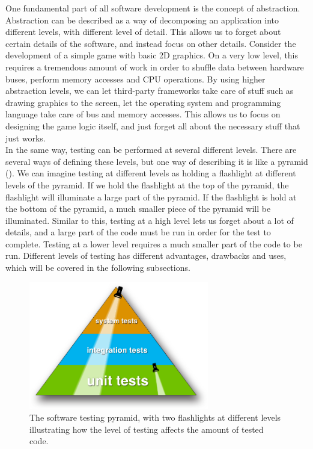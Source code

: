 
One fundamental part of all software development is the concept of
abstraction. Abstraction can be described as a way of decomposing  an
application into different levels, with different level of detail. This
allows us to forget about certain details of the software, and  instead
focus on other details. Consider the development of a simple game with
basic 2D graphics. On a very low level, this requires a tremendous
amount of work in order to shuffle data between hardware buses, perform
memory accesses and CPU operations. By using higher abstraction levels,
we can let third-party frameworks take care of stuff such as drawing
graphics to the screen, let the operating system and programming
language take care of bus and memory accesses. This allows us to focus
on designing the game logic itself, and just forget all about the
necessary stuff that just works.\cite{paper:abstraction}\\

In the same way, testing can be performed at several different levels.
There are several ways of defining these levels, but one way of
describing it is like a pyramid (). We can
imagine testing at different levels as holding a flashlight at different
levels of the pyramid. If we hold the flashlight at the top of the
pyramid, the flashlight will illuminate a large part of the pyramid. If
the flashlight is hold at the bottom of the pyramid, a much smaller
piece of the pyramid will be illuminated. Similar to this, testing at a
high level lets us forget about a lot of details, and a large part of
the code must be run in order for the test to complete. Testing at a
lower level requires a much smaller part of the code to be run.
Different levels of testing has different advantages, drawbacks and
uses, which will be covered in the following subsections.\\

\begin{figure}
\centering
\includegraphics[width=0.7\textwidth]{theory/levels/triangle}
\caption{The software testing pyramid, with two flashlights at different
         levels illustrating how the level of testing affects the amount
         of tested code.}
\label{fig:testing_pyramid}
\end{figure}
